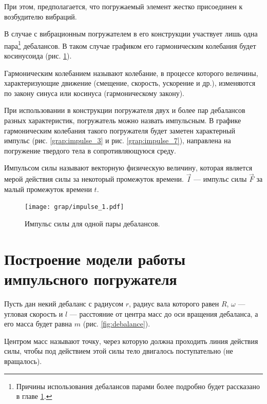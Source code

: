 При этом, предполагается, что погружаемый элемент жестко присоединен к возбудителю вибраций.

В случае с вибрационным погружателем в его конструкции участвует лишь одна
пара\footnote{Причины использования дебалансов парами более подробно будет рассказано в главе \ref{chapter:model}.} дебалансов.
В таком случае графиком его гармоническим колебания будет косинусоида (рис. \ref{grap:impulse_1}).

\begin{definition}
    Гармоническим колебанием называют колебание, в процессе которого величины, характеризующие движение (смещение, скорость, ускорение и др.),
    изменяются по закону синуса или косинуса (гармоническому закону).
\end{definition}

При использовании в конструкции погружателя двух и более пар дебалансов разных характеристик, погружатель можно назвать импульсным.
В графике гармоническим колебания такого погружателя будет заметен характерный импульс (рис. \ref{grap:impulse_3} и рис. \ref{grap:impulse_7}),
направлена на погружение твердого тела в сопротивляющуюся среду.

\begin{definition}
    Импульсом силы называют векторную физическую величину, которая является мерой действия силы за некоторый промежуток времени.
    $\vec{I}$ --- импульс силы $\vec{F}$ за малый промежуток времени $t$.
\end{definition}

\begin{figure}[h]
    \centering
    \texttt{[image: grap/impulse\_1.pdf]}
    \caption{Импульс силы для одной пары дебалансов.}
    \label{grap:impulse_1}
\end{figure}


\clearpage
\section{Построение модели работы импульсного погружателя}
\label{chapter:model}

Пусть дан некий дебаланс с радиусом $r$, радиус вала которого равен $R$,
$\omega$ --- угловая скорость и $l$ --- расстояние от центра масс до оси вращения дебаланса, а его масса будет равна $m$ (рис. \ref{fig:debalance}). 

\begin{definition}
    Центром масс называют точку, через которую должна проходить линия действия силы, чтобы под действием этой силы тело двигалось поступательно (не вращалось).
\end{definition}

